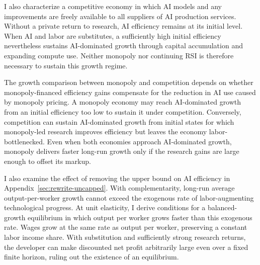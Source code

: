 
I also characterize a competitive economy in which AI models and any improvements are freely available to all suppliers of AI production services. Without a private return to research, AI efficiency remains at its initial level. When AI and labor are substitutes, a sufficiently high initial efficiency nevertheless sustains AI-dominated growth through capital accumulation and expanding compute use. Neither monopoly nor continuing RSI is therefore necessary to sustain this growth regime.

The growth comparison between monopoly and competition depends on whether monopoly-financed efficiency gains compensate for the reduction in AI use caused by monopoly pricing. A monopoly economy may reach AI-dominated growth from an initial efficiency too low to sustain it under competition. Conversely, competition can sustain AI-dominated growth from initial states for which monopoly-led research improves efficiency but leaves the economy labor-bottlenecked. Even when both economies approach AI-dominated growth, monopoly delivers faster long-run growth only if the research gains are large enough to offset its markup. %

I also examine the effect of removing the upper bound on AI efficiency in Appendix~\ref{sec:rewrite-uncapped}. With complementarity, long-run average output-per-worker growth cannot exceed the exogenous rate of labor-augmenting technological progress. At unit elasticity, I derive conditions for a balanced-growth equilibrium in which output per worker grows faster than this exogenous rate. Wages grow at the same rate as output per worker, preserving a constant labor income share. With substitution and sufficiently strong research returns, the developer can make discounted net profit arbitrarily large even over a fixed finite horizon, ruling out the existence of an equilibrium.

